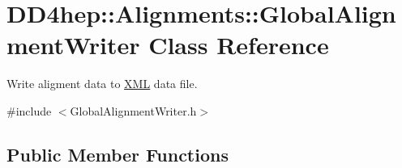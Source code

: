 \hypertarget{class_d_d4hep_1_1_alignments_1_1_global_alignment_writer}{
\section{DD4hep::Alignments::GlobalAlignmentWriter Class Reference}
\label{class_d_d4hep_1_1_alignments_1_1_global_alignment_writer}
}


Write aligment data to \hyperlink{namespace_d_d4hep_1_1_x_m_l}{XML} data file.  


{\ttfamily \#include $<$GlobalAlignmentWriter.h$>$}\subsection*{Public Member Functions}
